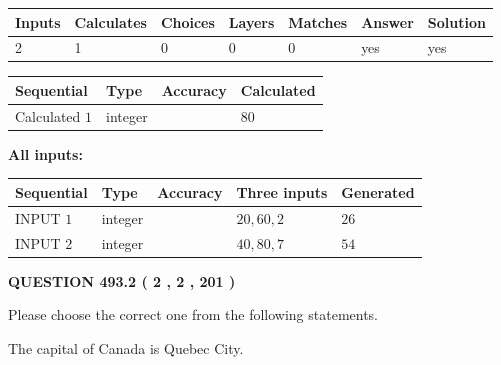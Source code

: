 \documentclass[12pt]{article}
\begin{document}
 

 
   
   
   
   
\noindent\begin{tabular}{|l|l|l|l|l|l|l|}
 \hline
Inputs & Calculates & Choices & Layers & Matches & Answer & Solution \\ \hline
 2  & 
 1  & 
 0
  & 
 0  & 
 0  & 
  yes & 
  yes 
  \\ \hline
 \end{tabular}
   
   
   
   
\noindent{}
   
   
  
  
\noindent\begin{tabular}{|l|l|l|l|}
\hline
 Sequential & Type & Accuracy & Calculated \\ 
\hline
 
 
  Calculated $  1 $ & integer &  & 
  $ 80 $ 
 \\  \hline  
 \end{tabular}
   
   
   
   
\noindent\vspace{0.1in}\hspace{-0.08in} {\textbf{\Large{All inputs: }}}
   
   
  
  
\noindent\begin{tabular}{|l|l|l|l|l|}
\hline
 Sequential & Type & Accuracy & Three inputs & Generated \\ 
\hline
 
 
  INPUT $  1 $ & integer &  & $
 20
 , 
 60
 , 
 2
 $ & $ 26 $ 
 \\  \hline  
 
 
  INPUT $  2 $ & integer &  & $
 40
 , 
 80
 , 
 7
 $ & $ 54 $ 
 \\  \hline  
 \end{tabular}
   
   
  
\vspace{0.2in}
  
{\textbf{\Large{QUESTION
493.2 
 ( 2 , 2 , 201 )
}}}
  
  
Please choose the correct one from the following statements.
 
 
The capital of Canada is Quebec City.
 
\end{document}
